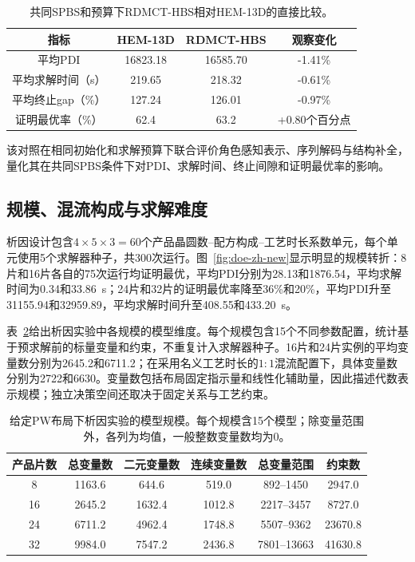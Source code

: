 \documentclass[final,5p,times,twocolumn]{elsarticle}
\newcommand{\method}{RDMCT-HBS}
\begin{document}
\begin{table}[!htbp]
\centering
\scriptsize
\caption{共同SPBS和预算下\method{}相对HEM-13D的直接比较。}
\label{tab:hem-direct-zh}
\begin{tabular}{cccc}
\toprule
指标 & HEM-13D & \method{} & 观察变化\\
\midrule
平均PDI & 16823.18 & 16585.70 & -1.41\%\\
平均求解时间（s） & 219.65 & 218.32 & -0.61\%\\
平均终止gap（\%） & 127.24 & 126.01 & -0.97\%\\
证明最优率（\%） & 62.4 & 63.2 & +0.80个百分点\\
\bottomrule
\end{tabular}
\end{table}

该对照在相同初始化和求解预算下联合评价角色感知表示、序列解码与结构补全，量化其在共同SPBS条件下对PDI、求解时间、终止间隙和证明最优率的影响。

\subsection{规模、混流构成与求解难度}

析因设计包含$4\times5\times3=60$个产品晶圆数--配方构成--工艺时长系数单元，每个单元使用5个求解器种子，共300次运行。图~\ref{fig:doe-zh-new}显示明显的规模转折：8片和16片各自的75次运行均证明最优，平均PDI分别为28.13和1876.54，平均求解时间为0.34和33.86~s；24片和32片的证明最优率降至36\%和20\%，平均PDI升至31155.94和32959.89，平均求解时间升至408.55和433.20~s。


表~\ref{tab:model-scale-cn}给出析因实验中各规模的模型维度。每个规模包含15个不同参数配置，统计基于预求解前的标量变量和约束，不重复计入求解器种子。16片和24片实例的平均变量数分别为2645.2和6711.2；在采用名义工艺时长的$1{:}1$混流配置下，具体变量数分别为2722和6630。变量数包括布局固定指示量和线性化辅助量，因此描述代数表示规模；独立决策空间还取决于固定关系与工艺约束。

\begin{table}[t]
\centering
\small
\setlength{\tabcolsep}{5pt}
\caption{给定PW布局下析因实验的模型规模。每个规模含15个模型；除变量范围外，各列为均值，一般整数变量数均为0。}
\label{tab:model-scale-cn}
\begin{tabular}{cccccc}
\toprule
产品片数 & 总变量数 & 二元变量数 & 连续变量数 & 总变量范围 & 约束数\\
\midrule
8 & 1163.6 & 644.6 & 519.0 & 892--1450 & 2947.0\\
16 & 2645.2 & 1632.4 & 1012.8 & 2217--3457 & 8727.0\\
24 & 6711.2 & 4962.4 & 1748.8 & 5507--9362 & 23670.8\\
32 & 9984.0 & 7547.2 & 2436.8 & 7801--13663 & 41630.8\\
\bottomrule
\end{tabular}
\end{table}
\end{document}
